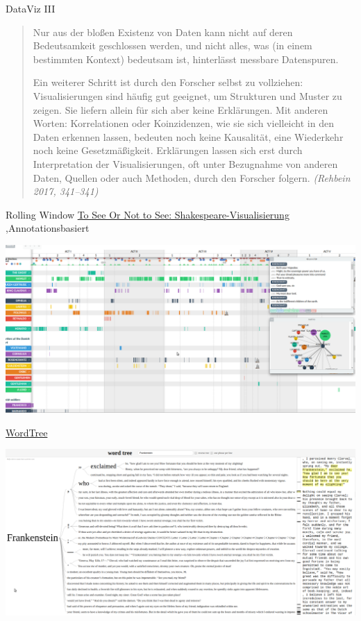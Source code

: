 \documentclass[10pt,a4paper]{article}
\begin{document}
\begin{multicols}{3}
\begin{textbox}{DataViz III}
\begin{quote}\scriptsize
Nur aus der bloßen Existenz von Daten kann nicht auf deren Bedeutsamkeit geschlossen werden, und nicht alles, was (in einem bestimmten Kontext) bedeutsam ist, hinterlässt messbare Datenspuren.

Ein weiterer Schritt ist durch den Forscher selbst zu vollziehen: Visualisierungen sind häufig gut geeignet, um Strukturen und Muster zu zeigen. Sie liefern allein für sich aber keine Erklärungen. Mit anderen Worten: Korrelationen oder Koinzidenzen, wie sie sich vielleicht in den Daten erkennen lassen, bedeuten noch keine Kausalität, eine Wiederkehr noch keine Gesetzmäßigkeit. Erklärungen lassen sich erst durch Interpretation der Visualisierungen, oft unter Bezugnahme von anderen Daten, Quellen oder auch Methoden, durch den Forscher folgern. \emph{(Rehbein 2017, 341--341)}
\end{quote}
\end{textbox}


\begin{textbox}{Rolling Window}
\href{http://www.thomaswilhelm.eu/shakespeare/output/hamlet.html}{To See Or Not to See: Shakespeare-Visualisierung} \sep Annotationsbasiert

\includegraphics[width=\textwidth]{toSeeOrNotToSee.png}
\end{textbox}


\begin{textbox}{\href{https://www.jasondavies.com/wordtree/}{WordTree}}

\includegraphics[width=\textwidth]{wordTree.png}
\end{textbox}


\end{multicols}
\end{document}
